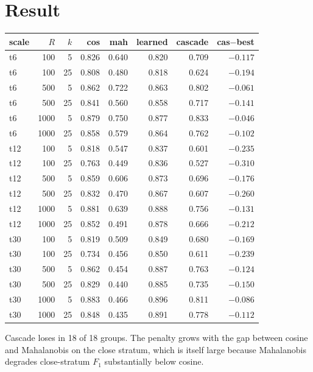 \documentclass[11pt]{article}
\begin{document}
\section{Result}
\begin{center}
\scriptsize
\begin{tabular}{lrrrrrrr}
\toprule
scale & $R$ & $k$ & cos & mah & learned & cascade & cas$-$best \\
\midrule
t6  & 100  & 5  & 0.826 & 0.640 & 0.820 & 0.709 & $-0.117$ \\
t6  & 100  & 25 & 0.808 & 0.480 & 0.818 & 0.624 & $-0.194$ \\
t6  & 500  & 5  & 0.862 & 0.722 & 0.863 & 0.802 & $-0.061$ \\
t6  & 500  & 25 & 0.841 & 0.560 & 0.858 & 0.717 & $-0.141$ \\
t6  & 1000 & 5  & 0.879 & 0.750 & 0.877 & 0.833 & $-0.046$ \\
t6  & 1000 & 25 & 0.858 & 0.579 & 0.864 & 0.762 & $-0.102$ \\
t12 & 100  & 5  & 0.818 & 0.547 & 0.837 & 0.601 & $-0.235$ \\
t12 & 100  & 25 & 0.763 & 0.449 & 0.836 & 0.527 & $-0.310$ \\
t12 & 500  & 5  & 0.859 & 0.606 & 0.873 & 0.696 & $-0.176$ \\
t12 & 500  & 25 & 0.832 & 0.470 & 0.867 & 0.607 & $-0.260$ \\
t12 & 1000 & 5  & 0.881 & 0.639 & 0.888 & 0.756 & $-0.131$ \\
t12 & 1000 & 25 & 0.852 & 0.491 & 0.878 & 0.666 & $-0.212$ \\
t30 & 100  & 5  & 0.819 & 0.509 & 0.849 & 0.680 & $-0.169$ \\
t30 & 100  & 25 & 0.734 & 0.456 & 0.850 & 0.611 & $-0.239$ \\
t30 & 500  & 5  & 0.862 & 0.454 & 0.887 & 0.763 & $-0.124$ \\
t30 & 500  & 25 & 0.829 & 0.440 & 0.885 & 0.735 & $-0.150$ \\
t30 & 1000 & 5  & 0.883 & 0.466 & 0.896 & 0.811 & $-0.086$ \\
t30 & 1000 & 25 & 0.848 & 0.435 & 0.891 & 0.778 & $-0.112$ \\
\bottomrule
\end{tabular}
\end{center}
Cascade loses in 18 of 18 groups. The penalty grows with the gap between cosine and Mahalanobis on the close stratum, which is itself large because Mahalanobis degrades close-stratum $F_1$ substantially below cosine.
\end{document}

